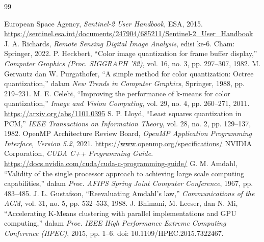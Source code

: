 \renewcommand{\bibname}{DAFTAR PUSTAKA}
\begin{thebibliography}{99}
 European Space Agency, \emph{Sentinel-2 User Handbook}, ESA, 2015. \url{https://sentinel.esa.int/documents/247904/685211/Sentinel-2_User_Handbook}
 J. A. Richards, \emph{Remote Sensing Digital Image Analysis}, edisi ke-6. Cham: Springer, 2022.
 P. Heckbert, ``Color image quantization for frame buffer display,'' \emph{Computer Graphics (Proc. SIGGRAPH '82)}, vol. 16, no. 3, pp. 297--307, 1982.
 M. Gervautz dan W. Purgathofer, ``A simple method for color quantization: Octree quantization,'' dalam \emph{New Trends in Computer Graphics}, Springer, 1988, pp. 219--231.
 M. E. Celebi, ``Improving the performance of k-means for color quantization,'' \emph{Image and Vision Computing}, vol. 29, no. 4, pp. 260--271, 2011. \url{https://arxiv.org/abs/1101.0395}
 S. P. Lloyd, ``Least squares quantization in PCM,'' \emph{IEEE Transactions on Information Theory}, vol. 28, no. 2, pp. 129--137, 1982.
 OpenMP Architecture Review Board, \emph{OpenMP Application Programming Interface, Version 5.2}, 2021. \url{https://www.openmp.org/specifications/}
 NVIDIA Corporation, \emph{CUDA C++ Programming Guide}. \url{https://docs.nvidia.com/cuda/cuda-c-programming-guide/}
 G. M. Amdahl, ``Validity of the single processor approach to achieving large scale computing capabilities,'' dalam \emph{Proc. AFIPS Spring Joint Computer Conference}, 1967, pp. 483--485.
 J. L. Gustafson, ``Reevaluating Amdahl's law,'' \emph{Communications of the ACM}, vol. 31, no. 5, pp. 532--533, 1988.
 J. Bhimani, M. Leeser, dan N. Mi, ``Accelerating K-Means clustering with parallel implementations and GPU computing,'' dalam \emph{Proc. IEEE High Performance Extreme Computing Conference (HPEC)}, 2015, pp. 1--6. doi: 10.1109/HPEC.2015.7322467.
\end{thebibliography}
